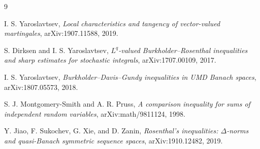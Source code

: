 \documentclass[11pt]{article}
\begin{document}
\begin{thebibliography}{9}

I. S. Yaroslavtsev,
\emph{Local characteristics and tangency of vector-valued martingales},
arXiv:1907.11588, 2019.

S. Dirksen and I. S. Yaroslavtsev,
\emph{\(L^q\)-valued Burkholder--Rosenthal inequalities and sharp estimates for
stochastic integrals},
arXiv:1707.00109, 2017.

I. S. Yaroslavtsev,
\emph{Burkholder--Davis--Gundy inequalities in UMD Banach spaces},
arXiv:1807.05573, 2018.

S. J. Montgomery-Smith and A. R. Pruss,
\emph{A comparison inequality for sums of independent random variables},
arXiv:math/9811124, 1998.

Y. Jiao, F. Sukochev, G. Xie, and D. Zanin,
\emph{Rosenthal's inequalities: \(\Delta\)-norms and quasi-Banach symmetric
sequence spaces},
arXiv:1910.12482, 2019.

\end{thebibliography}
\end{document}
